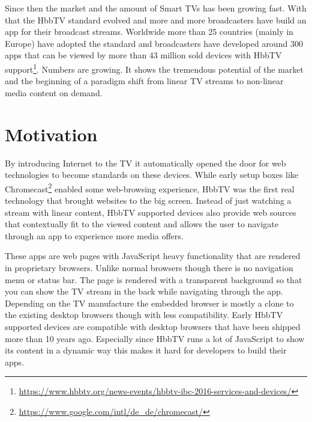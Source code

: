 Since then the market and the amount of Smart TVs has been growing fast. With that the HbbTV standard evolved
and more and more broadcasters have build an app for their broadcast streams. Worldwide more than 25 countries
(mainly in Europe) have adopted the standard and broadcasters have developed around 300 apps that can
be viewed by more than 43 million sold devices with HbbTV support\footnote{\url{https://www.hbbtv.org/news-events/hbbtv-ibc-2016-services-and-devices/}}.
Numbers are growing. It shows the tremendous potential of the market and the beginning of a paradigm shift
from linear TV streams to non-linear media content on demand.

\section{Motivation\label{sec:motivation}}

By introducing Internet to the TV it automatically opened the door for web technologies to become standards
on these devices. While early setup boxes like Chromecast\footnote{\url{https://www.google.com/intl/de_de/chromecast/}}
enabled some web-browsing experience, HbbTV was the first real technology that brought websites to the big screen.
Instead of just watching a stream with linear content, HbbTV supported devices also provide web sources that
contextually fit to the viewed content and allows the user to navigate through an app to experience more media
offers.

These apps are web pages with JavaScript heavy functionality that are rendered in proprietary browsers. Unlike
normal browsers though there is no navigation menu or status bar. The page is rendered with a transparent background
so that you can show the TV stream in the back while navigating through the app. Depending on the TV manufacture
the embedded browser is mostly a clone to the existing desktop browsers though with less compatibility.
Early HbbTV supported devices are compatible with desktop browsers that have been shipped more than 10 years ago.
Especially since HbbTV runs a lot of JavaScript to show its content in a dynamic way this makes it hard for
developers to build their apps.

